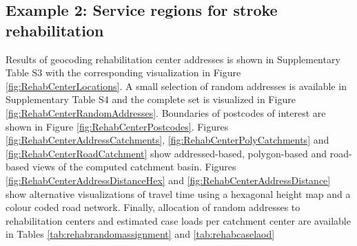 \documentclass[utf8]{frontiersHLTH}
\begin{document}
\subsection{Example 2: Service regions for stroke rehabilitation} 
Results of geocoding rehabilitation center addresses is shown in Supplementary
Table S3 with the corresponding visualization in Figure
\ref{fig:RehabCenterLocations}. A small selection of random addresses
is available in Supplementary Table S4 and the complete set is
visualized in Figure \ref{fig:RehabCenterRandomAddresses}. Boundaries
of postcodes of interest are shown in Figure
\ref{fig:RehabCenterPostcodes}. Figures
\ref{fig:RehabCenterAddressCatchments},
\ref{fig:RehabCenterPolyCatchments} and
\ref{fig:RehabCenterRoadCatchment} show addressed-based, polygon-based
and road-based views of the computed catchment basin. Figures
\ref{fig:RehabCenterAddressDistanceHex} and
\ref{fig:RehabCenterAddressDistance} show alternative visualizations
of travel time using a hexagonal height map and a colour coded road
network. Finally, allocation of random addresses to rehabilitation
centers and estimated case loads per catchment center are available in
Tables \ref{tab:rehabrandomassignment} and \ref{tab:rehabcaselaod}
\end{document}
